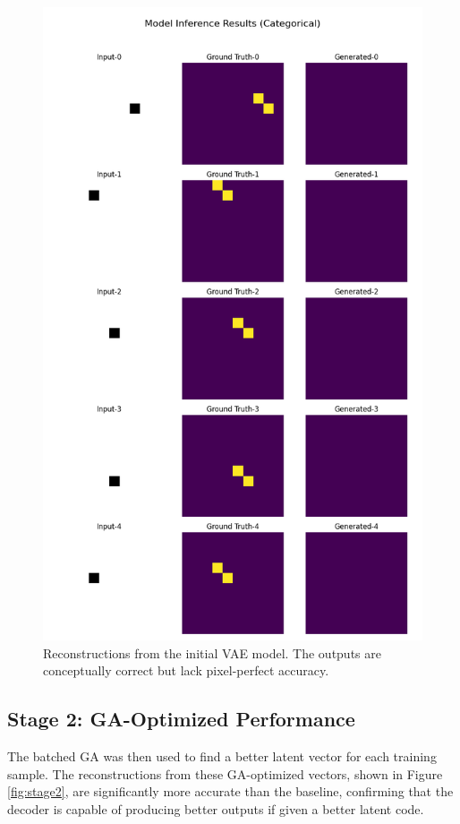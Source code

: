 \documentclass[11pt, a4paper, twocolumn]{article}
\begin{document}
\begin{figure}[H]
    \centering
    \includegraphics[width=\columnwidth]{stage1_train_predictions.png}
    \caption{Reconstructions from the initial VAE model. The outputs are conceptually correct but lack pixel-perfect accuracy.}
    \label{fig:stage1}
\end{figure}

\subsection{Stage 2: GA-Optimized Performance}
The batched GA was then used to find a better latent vector for each training sample. The reconstructions from these GA-optimized vectors, shown in Figure \ref{fig:stage2}, are significantly more accurate than the baseline, confirming that the decoder is capable of producing better outputs if given a better latent code.
\end{document}
